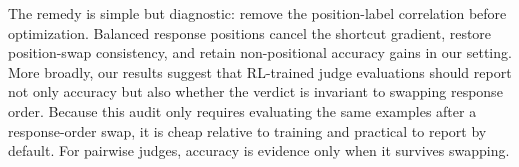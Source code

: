 \documentclass[letterpaper]{article}
\begin{document}
The remedy is simple but diagnostic: remove the position-label correlation before optimization. Balanced response positions cancel the shortcut gradient, restore position-swap consistency, and retain non-positional accuracy gains in our setting. More broadly, our results suggest that RL-trained judge evaluations should report not only accuracy but also whether the verdict is invariant to swapping response order. Because this audit only requires evaluating the same examples after a response-order swap, it is cheap relative to training and practical to report by default. For pairwise judges, accuracy is evidence only when it survives swapping.


\end{document}
